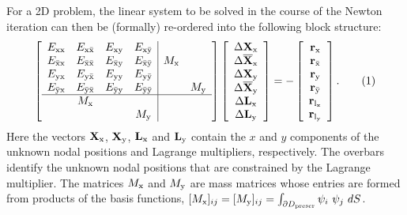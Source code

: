 \begin{DoxyItemize}
\end{DoxyItemize}For a 2D problem, the linear system to be solved in the course of the Newton iteration can then be (formally) re-\/ordered into the following block structure\+: \[ \left[ \begin{array}{cccc|cc} { E_{\rm xx}}&{ E_{\rm x\bar{\rm x}}}&{ E_{\rm xy}}&{ E_{\rm x\bar{\rm y}}}&&\\ { E_{\bar{\rm x}\rm x}}&{ E_{\bar{\rm x}\bar{\rm x}}}&{ E_{\bar{\rm x}\rm y}}&{ E_{\bar{\rm x}\bar{\rm y}}}&{ M_{\rm x}}&\\ { E_{\rm yx}}&{ E_{\rm y\bar{\rm x}}}&{ E_{\rm yy}}&{ E_{\rm y\bar{\rm y}}}&&\\ { E_{\bar{\rm y}\rm x}}&{ E_{\bar{\rm y}\bar{\rm x}}}&{ E_{\bar{\rm y}\rm y}}&{ E_{\bar{\rm y}\bar{\rm y}}}&&{ M_{\rm y}}\\ \hline &{ M_{\rm x}}&&&\\ &&&{ M_{\rm y}}&& \end{array} \right] \left[ \begin{array}{c} \Delta \mathbf{X}_{\rm x}\\ \Delta \mathbf{\overline{X}}_{\rm x}\\ \Delta \mathbf{X}_{\rm y}\\ \Delta \mathbf{\overline{X}}_{\rm y}\\ \Delta \mathbf{L}_{\rm x}\\ \Delta \mathbf{L}_{\rm y} \end{array} \right] = - \left[ \begin{array}{c} \mathbf{r}_{\rm x}\\ \mathbf{r}_{\bar{\rm x}}\\ \mathbf{r}_{\rm y}\\ \mathbf{r}_{\bar{\rm y}}\\ \mathbf{r}_{\rm l_x}\\ \mathbf{r}_{\rm l_y} \end{array} \right]. \ \ \ \ \ \ (1) \] Here the vectors ${\bf X}_{\rm x}$, ${\bf X}_{\rm y}$, ${\bf L}_{\rm x}$ and ${\bf L}_{\rm y}$ contain the $x$ and $y$ components of the unknown nodal positions and Lagrange multipliers, respectively. The overbars identify the unknown nodal positions that are constrained by the Lagrange multiplier. The matrices $M_{\rm x}$ and $M_{\rm y}$ are mass matrices whose entries are formed from products of the basis functions, $[M_{{\rm x}}]_{ij}=[M_{{\rm y}}]_{ij} = \int_{\partial D_{\rm prescr}} {\psi_i} \ {\psi_j} \ dS $.

